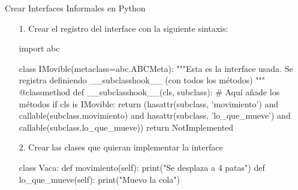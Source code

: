 \documentclass[10pt, envcountsect , spanish]{beamer}
\begin{document}
\begin{frame}[fragile]{Crear Interfaces Informales en Python} 

\begin{enumerate}

\item[1.] Crear el registro del interface con la siguiente sintaxis:

\footnotesize
\begin{pyconsole}[][frame=single, fontsize=\scriptsize]
import abc

class IMovible(metaclass=abc.ABCMeta):
    """Esta es la interface usada. Se registra
   definiendo __subclasshook__ (con todos los métodos)
    """
    @classmethod
    def __subclasshook__(cls, subclass): # Aquí añade los métodos
        if cls is IMovible:
            return (hasattr(subclass, 'movimiento') and
                    callable(subclass.movimiento) and
                    hasattr(subclass, 'lo_que_mueve') and
                    callable(subclass.lo_que_mueve))
        return NotImplemented

\end{pyconsole}

\normalsize

\item[2.] Crear las clases que quieran implementar la interface

\footnotesize
\begin{pyconsole}[][frame=single, fontsize=\scriptsize]
class Vaca:
    def movimiento(self):
        print("Se desplaza a 4 patas")
    def lo_que_mueve(self):
        print("Muevo la cola")

\end{pyconsole}
\end{enumerate}

\end{frame}
\end{document}
